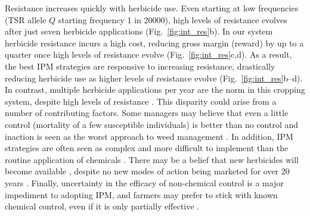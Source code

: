 \documentclass[9pt,twocolumn,twoside,lineno]{pnas-new}
\begin{document}
Resistance increases quickly with herbicide use. Even starting at low frequencies (TSR allele $Q$ starting frequency 1 in 20000), high levels of resistance evolves after just seven herbicide applications (Fig.\ \ref{fig:int_res}b). In our system herbicide resistance incurs a high cost, reducing gross margin (reward) by up to a quarter once high levels of resistance evolve (Fig.\ \ref{fig:int_res}c,d). As a result, the best IPM strategies are responsive to increasing resistance, drastically reducing herbicide use as higher levels of resistance evolve (Fig.\ \ref{fig:int_res}b--d). In contrast, multiple herbicide applications per year are the norm in this cropping system, despite high levels of resistance \citep{Hick2018}. This disparity could arise from a number of contributing factors. Some managers may believe that even a little control (mortality of a few susceptible individuals) is better than no control and inaction is seen as the worst approach to weed management \citep{Wils2008}. In addition, IPM strategies are often seen as complex and more difficult to implement than the routine application of chemicals \citep{Llew2006}. There may be a belief that new herbicides will become available \citep{Hurl2016}, despite no new modes of action being marketed for over 20 years \citep{Duke2012}. Finally, uncertainty in the efficacy of non-chemical control is a major impediment to adopting IPM, and farmers may prefer to stick with known chemical control, even if it is only partially effective \citep{Hurl2016}.
\end{document}
